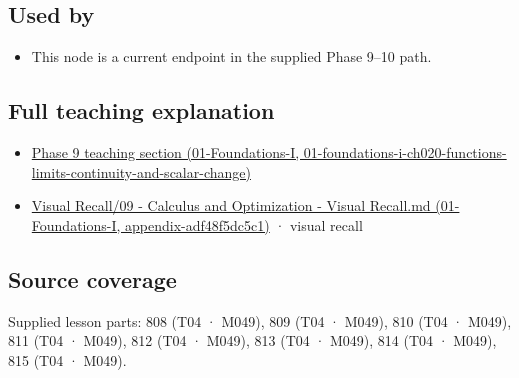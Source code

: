 \subsection{Used by}\label{appendix-d9f70bdfbc92-used-by}

\begin{itemize}
\tightlist
\item
  This node is a current endpoint in the supplied Phase 9--10 path.
\end{itemize}

\subsection{Full teaching explanation}\label{appendix-d9f70bdfbc92-full-teaching-explanation}

\begin{itemize}
\tightlist
\item
  \href{../01-Foundations-I/main.pdf\#nameddest=01-foundations-i-ch020-functions-limits-continuity-and-scalar-change}{Phase 9 teaching section (01-Foundations-I, 01-foundations-i-ch020-functions-limits-continuity-and-scalar-change)}
\item
  \href{../01-Foundations-I/main.pdf\#nameddest=appendix-adf48f5dc5c1}{Visual Recall/09 - Calculus and Optimization - Visual Recall.md (01-Foundations-I, appendix-adf48f5dc5c1)} · visual recall
\end{itemize}

\subsection{Source coverage}\label{appendix-d9f70bdfbc92-source-coverage}

Supplied lesson parts: 808 (T04 · M049), 809 (T04 · M049), 810 (T04 · M049), 811 (T04 · M049), 812 (T04 · M049), 813 (T04 · M049), 814 (T04 · M049), 815 (T04 · M049).
